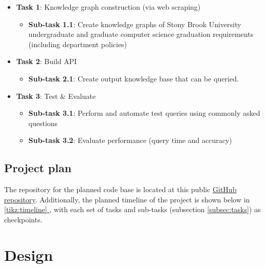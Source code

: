 \documentclass[12pt]{article}
\def \repoLink{https://github.com/AdebayoBraimah/CSE505}
\newcommand*{\fullref}[1]{\hyperref[{#1}]{\autoref*{#1} \nameref*{#1}}}
\begin{document}
    \begin{itemize}
        \item \textbf{Task 1}: Knowledge graph construction (via web scraping)
        \begin{itemize}
            \item \textbf{Sub-task 1.1}: Create knowledge graphs of Stony Brook University undergraduate and graduate computer science graduation requirements (including department policies)
        \end{itemize}
        \item \textbf{Task 2}: Build API
        \begin{itemize}
            \item \textbf{Sub-task 2.1}: Create output knowledge base that can be queried.
        \end{itemize}
        \item \textbf{Task 3}: Test \& Evaluate
        \begin{itemize}
            \item \textbf{Sub-task 3.1}: Perform and automate test queries using commonly asked questions
            \item \textbf{Sub-task 3.2}: Evaluate performance (query time and accuracy)
        \end{itemize}
    \end{itemize}

    \newpage
    
    \subsection{Project plan} 
    \label{subsec:plan}
    
    The repository for the planned code base is located at this public \href{\repoLink}{GitHub repository}. Additionally, the planned timeline of the project is shown below in \fullref{tikz:timeline}, with each set of tasks and sub-tasks (subsection \ref{subsec:tasks}) as checkpoints.
    
     \label{tikz:timeline} \newpage

    \section{Design}
    \label{sec:design}
\end{document}
